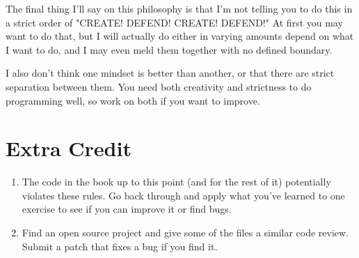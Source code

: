 The final thing I'll say on this philosophy is that I'm not telling you to do this in
a strict order of "CREATE! DEFEND! CREATE! DEFEND!"  At first you may want to do that,
but I will actually do either in varying amounts depend on what I want to do, and I may
even meld them together with no defined boundary.

I also don't think one mindset is better than another, or that there are strict separation
between them.  You need both creativity and strictness to do programming well, so work
on both if you want to improve.


\section{Extra Credit}

\begin{enumerate}
\item The code in the book up to this point (and for the rest of it) potentially violates these rules.  Go back through and apply what you've learned to one 
    exercise to see if you can improve it or find bugs.
\item Find an open source project and give some of the files a similar code review.  Submit a patch that fixes a bug if you find it.
\end{enumerate}

